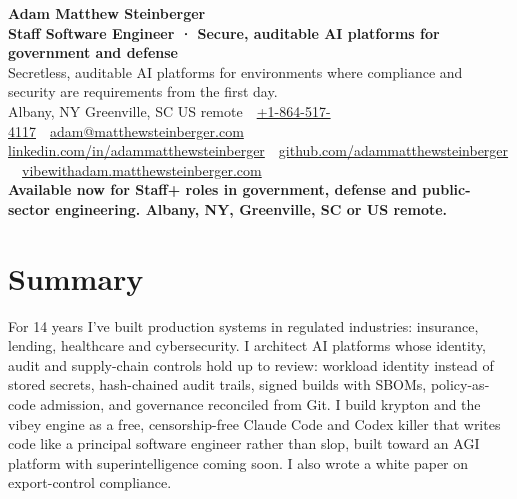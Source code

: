 \documentclass[10pt,letterpaper]{article}
\newcommand{\szname}{\fontsize{20pt}{24pt}\selectfont}
\newcommand{\sztitle}{\fontsize{10.5pt}{13pt}\selectfont}
\newcommand{\szbody}{\fontsize{9pt}{10.8pt}\selectfont}
\newcommand{\szmeta}{\fontsize{8pt}{10pt}\selectfont}
\begin{document}
\color{ink}\szbody

\begin{center}
{\szname\bfseries\color{primary} Adam Matthew Steinberger}\\[3pt]
{\sztitle\bfseries\color{accent} Staff Software Engineer · Secure, auditable AI platforms for government and defense}\\[4pt]
{\szbody Secretless, auditable AI platforms for environments where compliance and security are requirements from the first day.}\\[6pt]
{\szmeta\color{muted} Albany, NY \textbullet{} Greenville, SC \textbullet{} US remote\ {\color{rulecolor}\textbar}\ \href{tel:+18645174117}{+1-864-517-4117}\ {\color{rulecolor}\textbar}\ \href{mailto:adam@matthewsteinberger.com}{adam@matthewsteinberger.com}}\\[2pt]
{\szmeta\color{muted} \href{https://www.linkedin.com/in/adammatthewsteinberger/}{linkedin.com/in/adammatthewsteinberger}\ {\color{rulecolor}\textbar}\ \href{https://github.com/adammatthewsteinberger}{github.com/adammatthewsteinberger}\ {\color{rulecolor}\textbar}\ \href{https://vibewithadam.matthewsteinberger.com}{vibewithadam.matthewsteinberger.com}}\\[6pt]
{\szbody\bfseries Available now for Staff+ roles in government, defense and public-sector engineering. Albany, NY, Greenville, SC or US remote.}
\end{center}
\vspace{-6pt}
\section*{Summary}
For 14 years I've built production systems in regulated industries: insurance, lending, healthcare and cybersecurity. I architect AI platforms whose identity, audit and supply-chain controls hold up to review: workload identity instead of stored secrets, hash-chained audit trails, signed builds with SBOMs, policy-as-code admission, and governance reconciled from Git. I build krypton and the vibey engine as a free, censorship-free Claude Code and Codex killer that writes code like a principal software engineer rather than slop, built toward an AGI platform with superintelligence coming soon. I also wrote a white paper on export-control compliance.\par
\end{document}
